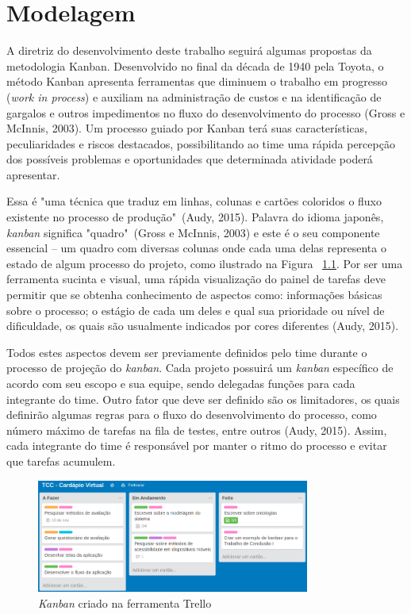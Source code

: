 \chapter{\label{chap:modelagem}Modelagem}
A diretriz do desenvolvimento deste trabalho seguirá algumas propostas da metodologia Kanban. Desenvolvido no final da década de 1940 pela Toyota, o método Kanban apresenta ferramentas que diminuem o trabalho em progresso (\textit{work in process}) e  auxiliam na administração de custos e na identificação de gargalos e outros impedimentos no fluxo do desenvolvimento do processo (Gross e McInnis, 2003)\nocite{GROSS2003}. Um processo guiado por Kanban terá suas características, peculiaridades e riscos destacados, possibilitando ao time uma rápida percepção dos possíveis problemas e oportunidades que determinada atividade poderá apresentar.

Essa é "uma técnica que traduz em linhas, colunas e cartões coloridos o fluxo existente no processo de produção"\ (Audy, 2015)\nocite{AUDY2015}. Palavra do idioma japonês, \textit{kanban} significa "quadro"\ (Gross e McInnis, 2003) e este é o seu componente essencial -- um quadro com diversas colunas onde cada uma delas representa o estado de algum processo do projeto, como ilustrado na Figura ~\ref{fig:kanban1}. Por ser uma ferramenta sucinta e visual, uma rápida visualização do painel de tarefas deve permitir que se obtenha conhecimento de aspectos como: informações básicas sobre o processo; o estágio de cada um deles e qual sua prioridade ou nível de dificuldade, os quais são usualmente indicados por cores diferentes (Audy, 2015). 

Todos estes aspectos devem ser previamente definidos pelo time durante o processo de projeção do \textit{kanban}. Cada projeto possuirá um \textit{kanban} específico de acordo com seu escopo e sua equipe, sendo delegadas funções para cada integrante do time. Outro fator que deve ser definido são os limitadores, os quais definirão algumas regras para o fluxo do desenvolvimento do processo, como número máximo de tarefas na fila de testes, entre outros (Audy, 2015). Assim, cada integrante do time é responsável por manter o ritmo do processo e evitar que tarefas acumulem.

\begin{figure}[htb]
\centering\includegraphics[width=0.8\textwidth]{fig/kanban1.png}
\caption[\emph{Kanban}]{\label{fig:kanban1}\emph{Kanban} criado na ferramenta Trello}
\end{figure}


